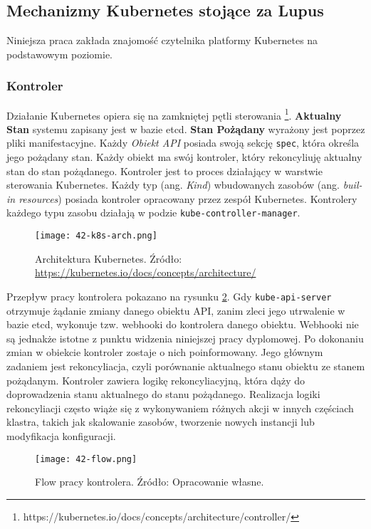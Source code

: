 \subsection{Mechanizmy Kubernetes stojące za Lupus}
Niniejsza praca zakłada znajomość czytelnika platformy Kubernetes na podstawowym poziomie.

\subsubsection{Kontroler}
Działanie Kubernetes opiera się na zamkniętej pętli sterowania \footnote{https://kubernetes.io/docs/concepts/architecture/controller/}. \textbf{Aktualny Stan} systemu zapisany jest w bazie etcd. \textbf{Stan Pożądany} wyrażony jest poprzez pliki manifestacyjne. Każdy \textit{Obiekt API} posiada swoją sekcję \texttt{spec}, która określa jego pożądany stan. Każdy obiekt ma swój kontroler, który rekoncyliuję aktualny stan do stan pożądanego. Kontroler jest to proces działający w warstwie sterowania Kubernetes. Każdy typ (ang. \textit{Kind}) wbudowanych zasobów (ang. \textit{buil-in resources}) posiada kontroler opracowany przez zespół Kubernetes. Kontrolery każdego typu zasobu działają w podzie \texttt{kube-controller-manager}. 

\begin{figure}[!h]
    \centering \texttt{[image: 42-k8s-arch.png]}
    \caption{Architektura Kubernetes. Źródło: \url{https://kubernetes.io/docs/concepts/architecture/}}\label{fig:42-k8s-arch}
\end{figure}

Przepływ pracy kontrolera pokazano na rysunku \ref{fig:42-flow}. Gdy \texttt{kube-api-server} otrzymuje żądanie zmiany danego obiektu API, zanim zleci jego utrwalenie w bazie etcd, wykonuje tzw. webhooki do kontrolera danego obiektu. Webhooki nie są jednakże istotne z punktu widzenia niniejszej pracy dyplomowej. Po dokonaniu zmian w obiekcie kontroler zostaje o nich poinformowany. Jego głównym zadaniem jest rekoncyliacja, czyli porównanie aktualnego stanu obiektu ze stanem pożądanym. Kontroler zawiera logikę rekoncyliacyjną, która dąży do doprowadzenia stanu aktualnego do stanu pożądanego. Realizacja logiki rekoncyliacji często wiąże się z wykonywaniem różnych akcji w innych częściach klastra, takich jak skalowanie zasobów, tworzenie nowych instancji lub modyfikacja konfiguracji.

\begin{figure}[!h]
    \centering \texttt{[image: 42-flow.png]}
    \caption{Flow pracy kontrolera. Źródło: Opracowanie własne.}\label{fig:42-flow}
\end{figure}

